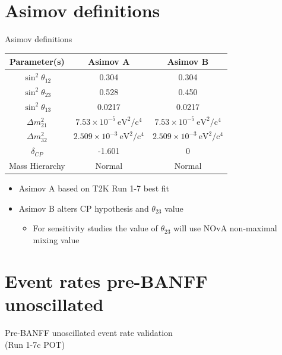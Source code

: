 \documentclass{beamer}
\begin{document}
\section*{Asimov definitions}
\begin{frame}{Asimov definitions}
	\centering
	\begin{tabular}{| c | c | c |}
	\hline
	Parameter(s) &	Asimov A & Asimov B	\\
	\hline
	$\sin^{2} \theta_{12}$	&	0.304	&	0.304	\\
	$\sin^{2}\theta_{23}$	&	0.528	&  0.450	\\
	$\sin^{2} \theta_{13}$	&	0.0217	&	0.0217	\\
	$\Delta m^{2}_{21}$	&	$7.53 \times 10^{-5}~\mbox{eV}^2/\mbox{c}^4$	&	$7.53 \times 10^{-5}~\mbox{eV}^2/\mbox{c}^4$	\\
	$\Delta m^{2}_{32}$ 	&	$2.509 \times 10^{-3}~\mbox{eV}^2/\mbox{c}^4$	&	$2.509 \times 10^{-3}~\mbox{eV}^2/\mbox{c}^4$	\\
	$\delta_{CP}$	&	-1.601	&	0	\\
	Mass Hierarchy	&	Normal	&	Normal	\\  
	\hline
	\end{tabular} %
	\begin{itemize}
		\item Asimov A based on T2K Run 1-7 best fit
		\item Asimov B alters CP hypothesis and $\theta_{23}$ value
		\begin{itemize}
			\item For sensitivity studies the value of $\theta_{23}$ will use NOvA non-maximal mixing value
		\end{itemize}
	\end{itemize}
\end{frame}

\section{Event rates pre-BANFF unoscillated}
\begin{frame}
	\centering
	\Large Pre-BANFF unoscillated event rate validation\\(Run 1-7c POT)
\end{frame}
\end{document}
